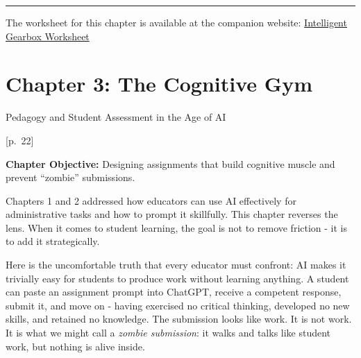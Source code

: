 \documentclass[
  letterpaper,
  DIV=11,
  numbers=noendperiod]{scrreprt}
\begin{document}
\begin{center}\rule{0.5\linewidth}{0.5pt}\end{center}

\begin{tcolorbox}[enhanced jigsaw, arc=.35mm, bottomrule=.15mm, bottomtitle=1mm, breakable, colback=white, colbacktitle=quarto-callout-note-color!10!white, colframe=quarto-callout-note-color-frame, coltitle=black, left=2mm, leftrule=.75mm, opacityback=0, opacitybacktitle=0.6, rightrule=.15mm, title=\textcolor{quarto-callout-note-color}{\faInfo}\hspace{0.5em}{Companion Worksheet}, titlerule=0mm, toprule=.15mm, toptitle=1mm]

The worksheet for this chapter is available at the companion website:
\href{https://dataii.com/ai/guidebook/\#:~:text=Intelligent\%20Gearbox\%20Worksheet}{Intelligent
Gearbox Worksheet}

\end{tcolorbox}


\chapter{Chapter 3: The Cognitive
Gym}\label{chapter-3-the-cognitive-gym}

Pedagogy and Student Assessment in the Age of AI

\hfill\break

{[}p.~22{]}

\textbf{Chapter Objective:} Designing assignments that build cognitive
muscle and prevent ``zombie'' submissions.

Chapters 1 and 2 addressed how educators can use AI effectively for
administrative tasks and how to prompt it skillfully. This chapter
reverses the lens. When it comes to student learning, the goal is not to
remove friction - it is to add it strategically.

Here is the uncomfortable truth that every educator must confront: AI
makes it trivially easy for students to produce work without learning
anything. A student can paste an assignment prompt into ChatGPT, receive
a competent response, submit it, and move on - having exercised no
critical thinking, developed no new skills, and retained no knowledge.
The submission looks like work. It is not work. It is what we might call
a \emph{zombie submission}: it walks and talks like student work, but
nothing is alive inside.
\end{document}
